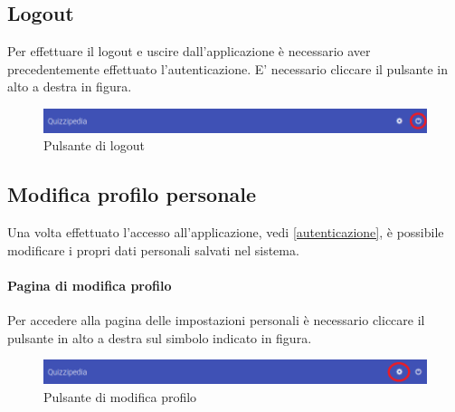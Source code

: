 \documentclass[12pt,a4paper]{article}
\begin{document}
		
	\subsection{Logout}
	Per effettuare il logout e uscire dall'applicazione è necessario aver precedentemente effettuato l'autenticazione.
	E' necessario cliccare il pulsante in alto a destra in figura.
	\begin{figure}[h]	
		\centering
		\includegraphics[width=1.0\linewidth]{../img/screenshot/barraLogout.png}
		\caption{Pulsante di logout}
		\label{Pulsante di logout}
	\end{figure}

	\subsection{Modifica profilo personale}
	Una volta effettuato l'accesso all'applicazione, vedi \ref{autenticazione}, è possibile modificare i propri dati personali salvati nel sistema.
    
	\paragraph{Pagina di modifica profilo}
	Per accedere alla pagina delle impostazioni personali è necessario cliccare il pulsante in alto a destra sul simbolo indicato in figura.
	
	\begin{figure}[h]
		\centering
		\includegraphics[width=1.0\linewidth]{../img/screenshot/barraImpostaz.png}
		\caption{Pulsante di modifica profilo}
		\label{Pulsante di modifica profilo}
	\end{figure}
	
\end{document}
